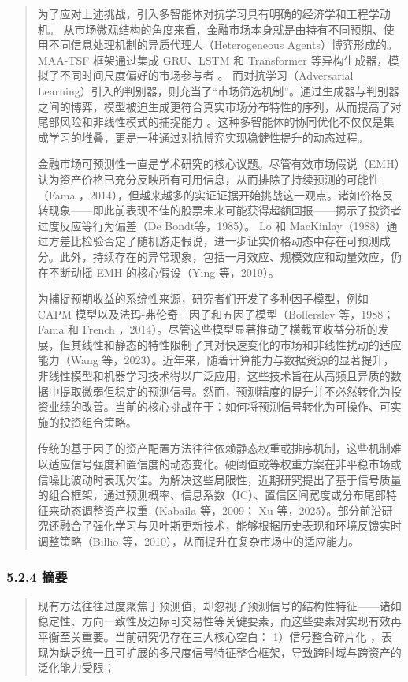 \begin{quote}
为了应对上述挑战，引入多智能体对抗学习具有明确的经济学和工程学动机。
从市场微观结构的角度来看，金融市场本身就是由持有不同预期、使用不同信息处理机制的异质代理人（Heterogeneous
Agents）博弈形成的。MAA-TSF 框架通过集成 GRU、LSTM 和 Transformer
等异构生成器，模拟了不同时间尺度偏好的市场参与者 。
而对抗学习（Adversarial
Learning）引入的判别器，则充当了``市场筛选机制''。通过生成器与判别器之间的博弈，模型被迫生成更符合真实市场分布特性的序列，从而提高了对尾部风险和非线性模式的捕捉能力
。这种多智能体的协同优化不仅仅是集成学习的堆叠，更是一种通过对抗博弈实现稳健性提升的动态过程。

金融市场可预测性一直是学术研究的核心议题。尽管有效市场假说（EMH）认为资产价格已充分反映所有可用信息，从而排除了持续预测的可能性（Fama
，2014），但越来越多的实证证据开始挑战这一观点。诸如价格反转现象------即此前表现不佳的股票未来可能获得超额回报------揭示了投资者过度反应等行为偏差（De
Bondt等，1985）。 Lo 和
MacKinlay（1988）通过方差比检验否定了随机游走假说，进一步证实价格动态中存在可预测成分。此外，持续存在的异常现象，包括一月效应、规模效应和动量效应，仍在不断动摇
EMH 的核心假设（Ying 等，2019）。

为捕捉预期收益的系统性来源，研究者们开发了多种因子模型，例如 CAPM
模型以及法玛-弗伦奇三因子和五因子模型（Bollerslev 等，1988； Fama 和
French
，2014）。尽管这些模型显著推动了横截面收益分析的发展，但其线性和静态的特性限制了其对快速变化的市场和非线性扰动的适应能力（Wang
等，2023）。近年来，随着计算能力与数据资源的显著提升，非线性模型和机器学习技术得以广泛应用，这些技术旨在从高频且异质的数据中提取微弱但稳定的预测信号。然而，预测精度的提升并不必然转化为投资业绩的改善。当前的核心挑战在于：如何将预测信号转化为可操作、可实施的投资组合策略。

传统的基于因子的资产配置方法往往依赖静态权重或排序机制，这些机制难以适应信号强度和置信度的动态变化。硬阈值或等权重方案在非平稳市场或信噪比波动时表现欠佳。为解决这些局限性，近期研究提出了基于信号质量的组合框架，通过预测概率、信息系数（IC）、置信区间宽度或分布尾部特征来动态调整资产权重（Kabaila
等，2009； Xu
等，2025）。部分前沿研究还融合了强化学习与贝叶斯更新技术，能够根据历史表现和环境反馈实时调整策略（Billio
等，2010），从而提升在复杂市场中的适应能力。
\end{quote}

\subsubsection{5.2.4 摘要}

\begin{quote}
现有方法往往过度聚焦于预测值，却忽视了预测信号的结构性特征------诸如稳定性、方向一致性及边际可交易性等关键要素，而这些要素对实现有效再平衡至关重要。当前研究仍存在三大核心空白：
1）信号整合碎片化
，表现为缺乏统一且可扩展的多尺度信号特征整合框架，导致跨时域与跨资产的泛化能力受限；
\end{quote}

